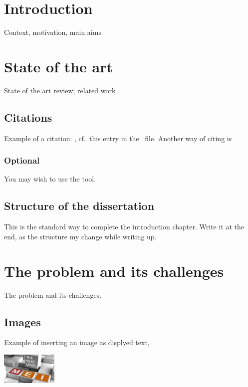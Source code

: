 \documentclass[
  oneside,
  11pt, a4paper,
  footinclude=true,
  headinclude=true,
  cleardoublepage=empty
]{scrbook}
\begin{document}
\chapter{Introduction}
	Context, motivation, main aims	

\chapter{State of the art}
	State of the art review; related work

\section{Citations}
Example of a citation: \cite{GRM97}, cf.\ this entry in the \Bibtex\ file.
Another way of citing is \citep{KeR88}

\subsection{Optional}
You may wish to use the  tool.

\section{Structure of the dissertation}
This is the standard way to complete the introduction chapter. Write it at the end, as the structure my change while writing up.

\chapter{The problem and its challenges}
         The problem and its challenges.

\section{Images}
	Example of inserting an image as displyed text,
\begin{center}
	\includegraphics[width=0.2\textwidth]{img/mei-logo-03.jpg}
\end{center}
\end{document}
